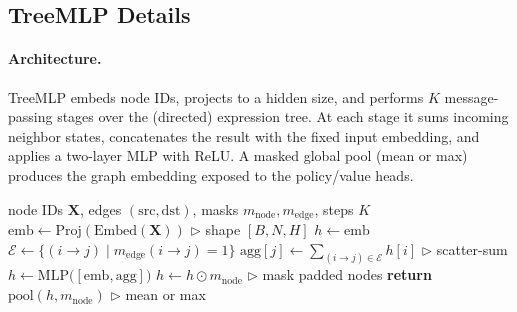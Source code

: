 \documentclass{article}
\theoremstyle{plain}
\theoremstyle{definition}
\theoremstyle{remark}
\begin{document}
\subsection{TreeMLP Details}
\label{app:treemlp}

\paragraph{Architecture.}
TreeMLP embeds node IDs, projects to a hidden size, and performs $K$ message-passing stages over the (directed) expression tree.
At each stage it sums incoming neighbor states, concatenates the result with the fixed input embedding, and applies a two-layer MLP with ReLU.
A masked global pool (mean or max) produces the graph embedding exposed to the policy/value heads.

\begin{algorithm}[t]
\caption{TreeMLP message passing and pooling}
\label{alg:treemlp}
\begin{algorithmic}[1]
\REQUIRE node IDs $\mathbf{X}$, edges $(\text{src},\text{dst})$, masks $m_{\text{node}}, m_{\text{edge}}$, steps $K$
\STATE $\text{emb} \leftarrow \mathrm{Proj}(\mathrm{Embed}(\mathbf{X}))$ \hfill$\triangleright$ shape $[B,N,H]$
\STATE $h \leftarrow \text{emb}$
  \STATE $\mathcal{E} \leftarrow \{(i\!\to\!j) \mid m_{\text{edge}}(i\!\to\!j)=1\}$
  \STATE $\text{agg}[j] \leftarrow \sum_{(i\to j)\in \mathcal{E}} h[i]$ \hfill$\triangleright$ scatter-sum
  \STATE $h \leftarrow \mathrm{MLP}\big([\text{emb}, \text{agg}]\big)$
  \STATE $h \leftarrow h \odot m_{\text{node}}$ \hfill$\triangleright$ mask padded nodes
\ENDFOR
\STATE \textbf{return} $\mathrm{pool}(h, m_{\text{node}})$ \hfill$\triangleright$ mean or max
\end{algorithmic}
\end{algorithm}
\end{document}
